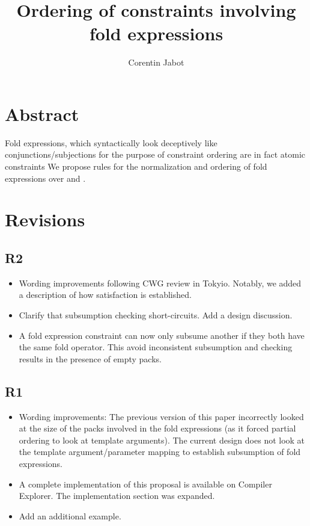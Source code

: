 \documentclass{wg21}
\title{Ordering of constraints involving fold expressions}
\author{Corentin Jabot}{corentin.jabot@gmail.com}
\begin{document}
\maketitle

\section{Abstract}

Fold expressions, which syntactically look deceptively like conjunctions/subjections for the purpose of constraint ordering are in fact atomic constraints
We propose rules for the normalization and ordering of fold expressions over \tcode{\&\&} and \tcode{||}.

\section{Revisions}

\subsection{R2}

\begin{itemize}
\item Wording improvements following CWG review in Tokyio. Notably, we added a description of how satisfaction is established.
\item Clarify that subsumption checking short-circuits. Add a design discussion.
\item A fold expression constraint can now only subsume another if they both have the same fold operator. This avoid inconsistent subsumption and checking results in the presence of empty packs.
\end{itemize}


\subsection{R1}

\begin{itemize}
\item Wording improvements: The previous version of this paper incorrectly looked at the size of the packs involved in the fold expressions (as it forced partial ordering to look at template arguments).
The current design does not look at the template argument/parameter mapping to establish subsumption of fold expressions.
\item A complete implementation of this proposal is available on Compiler Explorer. The implementation section was expanded.
\item Add an additional example.
\end{itemize}
\end{document}
